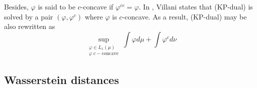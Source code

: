 \documentclass{article}
\theoremstyle{definition}
\theoremstyle{remark}
\begin{document}
Besides, $\varphi$ is said to be $c$-concave if $\varphi^{cc}=\varphi$. In \cite{villani2003topics}, Villani states that (KP-dual) is solved by a pair $(\varphi, \varphi^c)$ where $\varphi$ is $c$-concave. As a result, (KP-dual) may be also rewritten as 
\begin{equation}\tag{KP-dual 2}
\sup_{\substack{\varphi \in L_1(\mu)\\ \varphi\; c-\text{concave}}} \int \varphi d\mu + \int \varphi^c d\nu
\end{equation}

\subsection{Wasserstein distances}

\newpage


\end{document}
